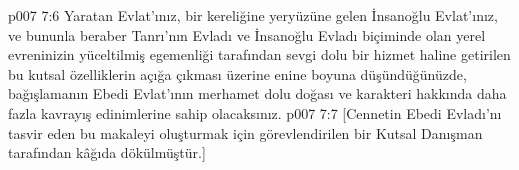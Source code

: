 \vs p007 7:6 Yaratan Evlat’ınız, bir kereliğine yeryüzüne gelen İnsanoğlu Evlat’ınız, ve bununla beraber Tanrı'nın Evladı ve İnsanoğlu Evladı biçiminde olan yerel evreninizin yüceltilmiş egemenliği tarafından sevgi dolu bir hizmet haline getirilen bu kutsal özelliklerin açığa çıkması üzerine enine boyuna düşündüğünüzde, bağışlamanın Ebedi Evlat’ının merhamet dolu doğası ve karakteri hakkında daha fazla kavrayış edinimlerine sahip olacaksınız.
\vs p007 7:7 [Cennetin Ebedi Evladı’nı tasvir eden bu makaleyi oluşturmak için görevlendirilen bir Kutsal Danışman tarafından kâğıda dökülmüştür.]
